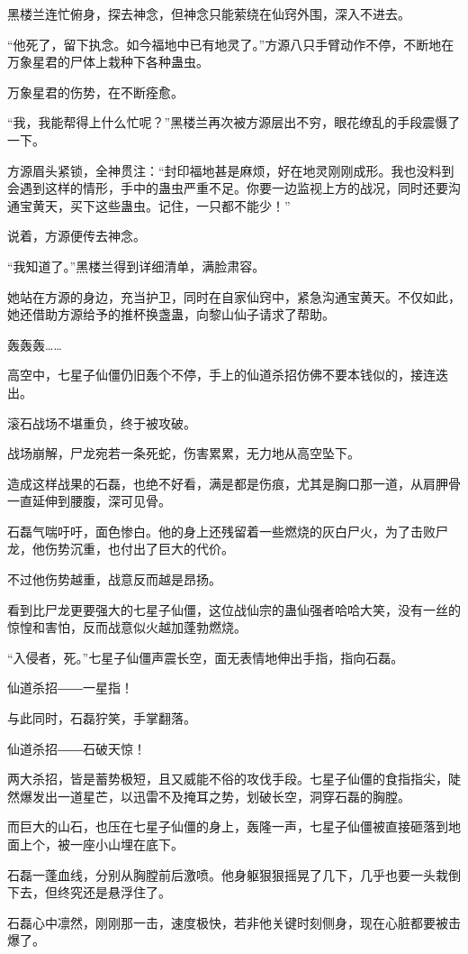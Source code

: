\begin{this_body}
黑楼兰连忙俯身，探去神念，但神念只能萦绕在仙窍外围，深入不进去。

“他死了，留下执念。如今福地中已有地灵了。”方源八只手臂动作不停，不断地在万象星君的尸体上栽种下各种蛊虫。

万象星君的伤势，在不断痊愈。

“我，我能帮得上什么忙呢？”黑楼兰再次被方源层出不穷，眼花缭乱的手段震慑了一下。

方源眉头紧锁，全神贯注：“封印福地甚是麻烦，好在地灵刚刚成形。我也没料到会遇到这样的情形，手中的蛊虫严重不足。你要一边监视上方的战况，同时还要沟通宝黄天，买下这些蛊虫。记住，一只都不能少！”

说着，方源便传去神念。

“我知道了。”黑楼兰得到详细清单，满脸肃容。

她站在方源的身边，充当护卫，同时在自家仙窍中，紧急沟通宝黄天。不仅如此，她还借助方源给予的推杯换盏蛊，向黎山仙子请求了帮助。

轰轰轰……

高空中，七星子仙僵仍旧轰个不停，手上的仙道杀招仿佛不要本钱似的，接连迭出。

滚石战场不堪重负，终于被攻破。

战场崩解，尸龙宛若一条死蛇，伤害累累，无力地从高空坠下。

造成这样战果的石磊，也绝不好看，满是都是伤痕，尤其是胸口那一道，从肩胛骨一直延伸到腰腹，深可见骨。

石磊气喘吁吁，面色惨白。他的身上还残留着一些燃烧的灰白尸火，为了击败尸龙，他伤势沉重，也付出了巨大的代价。

不过他伤势越重，战意反而越是昂扬。

看到比尸龙更要强大的七星子仙僵，这位战仙宗的蛊仙强者哈哈大笑，没有一丝的惊惶和害怕，反而战意似火越加蓬勃燃烧。

“入侵者，死。”七星子仙僵声震长空，面无表情地伸出手指，指向石磊。

仙道杀招――一星指！

与此同时，石磊狞笑，手掌翻落。

仙道杀招――石破天惊！

两大杀招，皆是蓄势极短，且又威能不俗的攻伐手段。七星子仙僵的食指指尖，陡然爆发出一道星芒，以迅雷不及掩耳之势，划破长空，洞穿石磊的胸膛。

而巨大的山石，也压在七星子仙僵的身上，轰隆一声，七星子仙僵被直接砸落到地面上个，被一座小山埋在底下。

石磊一蓬血线，分别从胸膛前后激喷。他身躯狠狠摇晃了几下，几乎也要一头栽倒下去，但终究还是悬浮住了。

石磊心中凛然，刚刚那一击，速度极快，若非他关键时刻侧身，现在心脏都要被击爆了。


\end{this_body}
